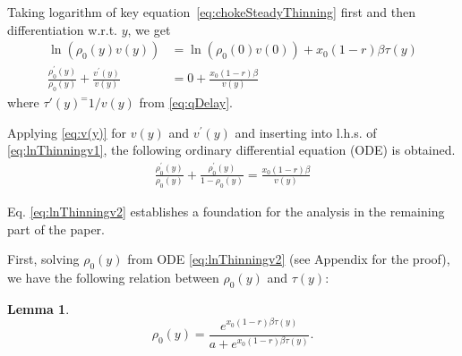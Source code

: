 \documentclass{IEEEtran}
\newtheorem{lemma}{Lemma}
\begin{document}
    Taking logarithm of key equation~\eqref{eq:chokeSteadyThinning} first and then differentiation w.r.t. $y$, we get
    \begin{align}
        \ln(\rho_0(y)v(y))&=\ln(\rho_0(0)v(0))+ x_0(1-r)\beta \tau(y) \nonumber \\
        \frac{\rho_0^{'}(y)}{\rho_0(y)}+ \frac{v^{'}(y)}{v(y)} &= 0+ \frac{x_0(1-r) \beta}{v(y)} \label{eq:lnThinningv1}
    \end{align}
    where $\tau{'}(y)^=1/v(y)$ from \eqref{eq:qDelay}.


    Applying \eqref{eq:v(y)} for $v(y)$ and $v^{'}(y)$ and inserting into l.h.s. of \eqref{eq:lnThinningv1}, the following ordinary differential equation (ODE) is obtained.
\begin{align}
        \frac{\rho_0^{'}(y)}{\rho_0(y)}+ \frac{\rho_0^{'}(y)}{1-\rho_0(y)} = \frac{x_0(1-r) \beta}{v(y)} \label{eq:lnThinningv2}
    \end{align}

Eq. \eqref{eq:lnThinningv2} establishes a foundation for the analysis in the remaining part of the paper.

First, solving $\rho_0(y)$ from ODE \eqref{eq:lnThinningv2} (see Appendix for the proof), we have the following relation between $\rho_0(y)$ and $\tau(y)$:

\begin{lemma}\label{lemma-rho0(y)}
    \begin{equation}
        \rho_0(y)=\frac{e^{x_0(1-r)\beta\tau(y)}}{a+e^{x_0(1-r)\beta\tau(y)}}. \label{eq:rho_0y}
    \end{equation}
\end{lemma}
\vspace{2mm}
\end{document}
